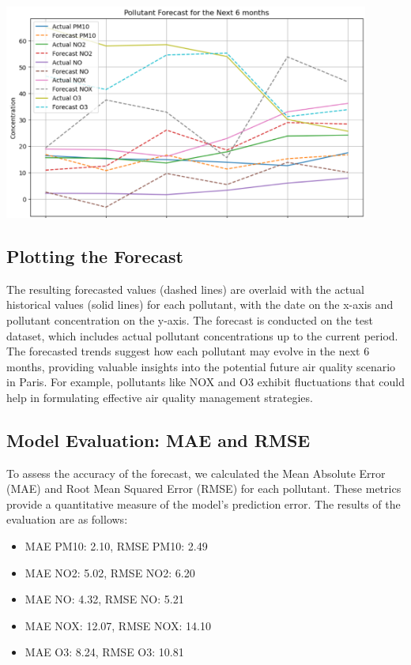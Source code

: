 \documentclass{modeleRapport}
\begin{document}
\begin{center}
    \includegraphics[width=12cm]{Images/PollutantsForecast.png}
\end{center}

\subsection{Plotting the Forecast}
The resulting forecasted values (dashed lines) are overlaid with the actual historical values (solid lines) for each pollutant, 
with the date on the x-axis and pollutant concentration on the y-axis. The forecast is conducted on the test dataset, 
which includes actual pollutant concentrations up to the current period.\\

The forecasted trends suggest how each pollutant may evolve in the next 6 months, providing valuable insights into the 
potential future air quality scenario in Paris. For example, pollutants like NOX and O3 exhibit fluctuations that could help 
in formulating effective air quality management strategies.\\

\subsection{Model Evaluation: MAE and RMSE}

To assess the accuracy of the forecast, we calculated the Mean Absolute Error (MAE) and Root Mean Squared Error (RMSE) 
for each pollutant. These metrics provide a quantitative measure of the model's prediction error. The results of the 
evaluation are as follows:\\

\begin{itemize}
    \item MAE PM10: 2.10, RMSE PM10: 2.49
    \item MAE NO2: 5.02, RMSE NO2: 6.20
    \item MAE NO: 4.32, RMSE NO: 5.21
    \item MAE NOX: 12.07, RMSE NOX: 14.10
    \item MAE O3: 8.24, RMSE O3: 10.81
\end{itemize}
\end{document}
